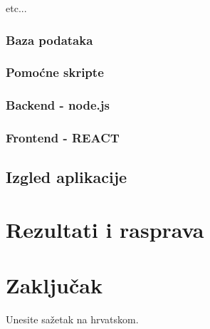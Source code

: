\documentclass[zavrsnirad]{fer}
\begin{document}
etc...

\subsection{Baza podataka}

\subsection{Pomoćne skripte}

\subsection{Backend - node.js}

\subsection{Frontend - REACT}

\section{Izgled aplikacije}


\chapter{Rezultati i rasprava}
\label{pog:rezultati_i_rasprava}


\chapter{Zaključak}
\label{pog:zakljucak}




\nocite{*}




\begin{sazetak}
  Unesite sažetak na hrvatskom.

  \blindtext
\end{sazetak}
\end{document}
